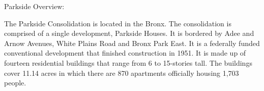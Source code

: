 Parkside Overview:  

   

The Parkside Consolidation is located in the Bronx. The consolidation is comprised of a single development, Parkside Houses. It is bordered by Adee and Arnow Avenues, White Plains Road and Bronx Park East. It is a federally funded conventional development that finished construction in 1951. It is made up of fourteen residential buildings that range from 6 to 15-stories tall. The buildings cover 11.14 acres in which there are 870 apartments officially housing 1,703 people.